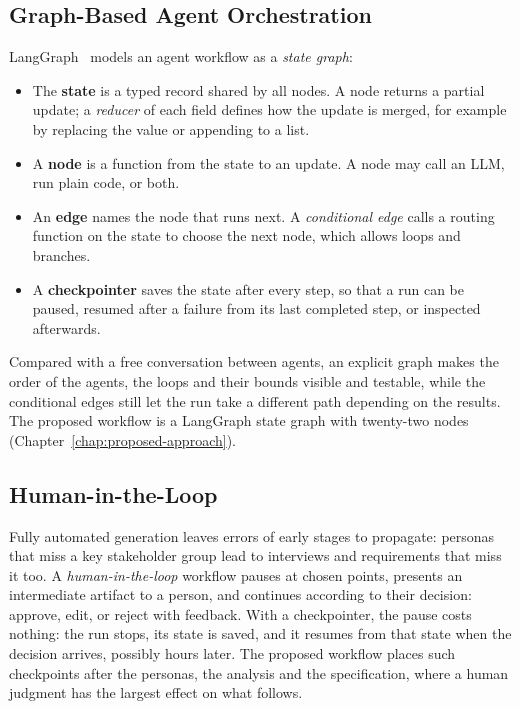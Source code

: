 \subsection{Graph-Based Agent Orchestration}
\label{sec:bg-langgraph}

LangGraph~\cite{langgraph} models an agent workflow as a \emph{state graph}:
\begin{itemize}
    \item The \textbf{state} is a typed record shared by all nodes. A node returns a partial update; a \emph{reducer} of each field defines how the update is merged, for example by replacing the value or appending to a list.
    \item A \textbf{node} is a function from the state to an update. A node may call an LLM, run plain code, or both.
    \item An \textbf{edge} names the node that runs next. A \emph{conditional edge} calls a routing function on the state to choose the next node, which allows loops and branches.
    \item A \textbf{checkpointer} saves the state after every step, so that a run can be paused, resumed after a failure from its last completed step, or inspected afterwards.
\end{itemize}
Compared with a free conversation between agents, an explicit graph makes the order of the agents, the loops and their bounds visible and testable, while the conditional edges still let the run take a different path depending on the results. The proposed workflow is a LangGraph state graph with twenty-two nodes (Chapter~\ref{chap:proposed-approach}).

\subsection{Human-in-the-Loop}
\label{sec:bg-hitl}

Fully automated generation leaves errors of early stages to propagate: personas that miss a key stakeholder group lead to interviews and requirements that miss it too. A \emph{human-in-the-loop} workflow pauses at chosen points, presents an intermediate artifact to a person, and continues according to their decision: approve, edit, or reject with feedback. With a checkpointer, the pause costs nothing: the run stops, its state is saved, and it resumes from that state when the decision arrives, possibly hours later. The proposed workflow places such checkpoints after the personas, the analysis and the specification, where a human judgment has the largest effect on what follows.
